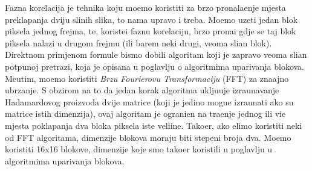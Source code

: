 Fazna korelacija je tehnika koju mo\zh emo koristiti za brzo pronala\zh enje mjesta preklapanja dviju sli\ch nih slika, \sh to nama upravo i treba. Mo\zh emo uzeti jedan blok piksela jednog frejma, te, koriste\cj i faznu korelaciju, brzo prona\cj i
gdje se taj blok piksela nalazi u drugom frejmu (ili barem neki drugi, veoma sli\ch an blok). Direktnom primjenom formule bismo dobili algoritam koji je zapravo veoma sli\ch an potpunoj pretrazi, koja je opisana u poglavlju o algoritmima
uparivanja blokova. Me\dj utim, mo\zh emo koristiti \textit{Brzu Fourierovu Transformaciju} (FFT) za zna\ch ajno ubrzanje. S obzirom na to da jedan korak algoritma uklju\ch uje izra\ch unavanje Hadamardovog proizvoda dvije matrice
(koji je jedino mogu\cj e izra\ch unati ako su matrice istih dimenzija), ovaj algoritam je ograni\ch en na tra\zh enje jednog ili vi\sh e mjesta poklapanja dva bloka piksela iste veli\ch ine. Tako\dj er, ako \zh elimo koristiti neki od FFT algoritama,
dimenzije blokova moraju biti stepeni broja dva. Mo\zh emo koristiti 16x16 blokove, dimenzije koje smo tako\dj er koristili u poglavlju u algoritmima uparivanja blokova. 


